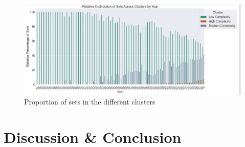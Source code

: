 \documentclass{article}
\theoremstyle{plain}
\theoremstyle{definition}
\theoremstyle{remark}
\begin{document}
\begin{figure}[ht]
 \vskip 0.2in
 \begin{center}
 \centerline{\includegraphics[width=\columnwidth]{Clustering.jpeg}}
\caption{Proportion of sets in the different clusters}
\label{icml-historical}
 \end{center}
 \vskip -0.2in
\end{figure}

\section{Discussion \& Conclusion}\label{sec:conclusion}
\end{document}
